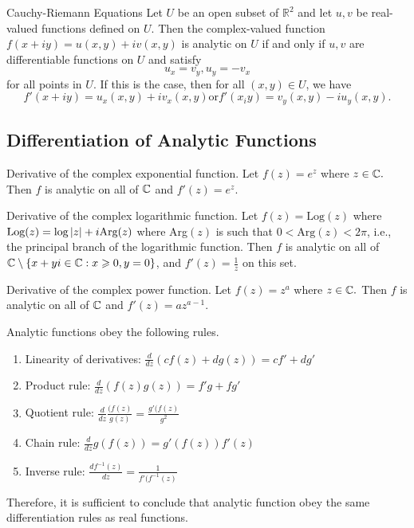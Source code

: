 \documentclass[11pt,reqno,oneside,a4paper]{article}
\begin{document}
\begin{thm}{Cauchy-Riemann Equations}
Let $U$ be an open subset of $\mathbb{R}^2$ and let $u,v$ be real-valued functions defined on $U.$ Then the complex-valued function $f(x+iy) = u(x,y) + iv(x,y)$ is analytic on $U$ if and only if $u,v$ are differentiable functions on $U$ and satisfy $$u_x=v_y, u_y = -v_x$$ for all points in $U$. If this is the case, then for all $(x,y)\in U$, we have $$f'(x+iy) = u_x(x,y)+iv_x(x,y) \text{or} f'(x_iy) = v_y(x,y) - iu_y(x,y).$$
\end{thm}




\subsection{Differentiation of Analytic Functions}

\begin{thm}{Derivative of the complex exponential function.}
Let $f(z) = e^z$ where $z\in\mathbb C.$ Then $f$ is analytic on all of $\mathbb C$ and $f'(z) = e^z.$
\end{thm}


\begin{thm}{Derivative of the complex logarithmic function.}
Let $f(z)=\text{Log}(z)$ where $\text{Log}(z)=\text{log}\left\lvert z\right\rvert+i\text{Arg}(z)$ where Arg$(z)$ is such that $0< \text{Arg}(z)<2\pi$, i.e., the principal branch of the logarithmic function.
Then $f$ is analytic on all of $\mathbb C \setminus \{x+yi \in \mathbb C : x \geqslant 0, y = 0\}$, and $f'(z)=\frac{1}{z}$ on this set.
\end{thm}

\begin{thm}{Derivative of the complex power function.}
Let $f(z) = z^a$ where $z\in\mathbb C.$ Then $f$ is analytic on all of $\mathbb C$ and $f'(z) = az^{a-1}.$
\end{thm}

Analytic functions obey the following rules. 

\begin{enumerate}
	\item Linearity of derivatives: $\frac{d}{dz} (cf(z) + dg(z)) = cf' + dg'$
	\item Product rule: $\frac{d}{dz}(f(z)g(z)) = f'g + fg'$
	\item Quotient rule: $\frac{d}{dz} \frac{(f(z)}{g(z)} = \frac{g'(f(z)}{g^2}$
	\item Chain rule: $\frac{d}{dz} g(f(z)) = g'(f(z))f'(z)$
	\item Inverse rule: $\frac{df^{-1}(z)}{dz} = \frac{1}{f'(f^{-1}(z)}$
\end{enumerate}

Therefore, it is sufficient to conclude that analytic function obey the same differentiation rules as real functions.
\end{document}
